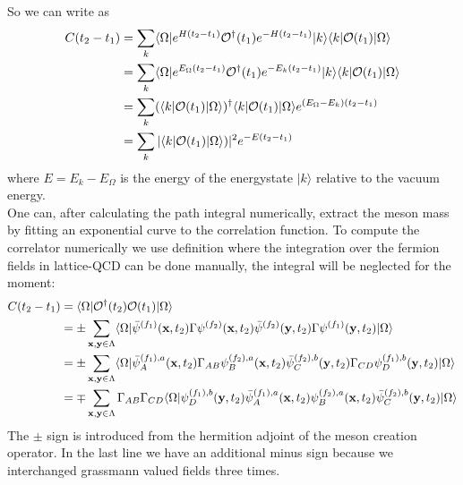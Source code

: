        So we can write  as
        \begin{equation}
            \begin{aligned}
                C(t_2 - t_1) &= \sum_k \langle\Omega|e^{H(t_2 - t_1)}\mathcal{O}^\dagger(t_1)e^{-H(t_2 - t_1)} |k\rangle\langle k| \mathcal{O}(t_1)|\Omega\rangle\\
                &= \sum_k \langle\Omega|e^{E_\Omega(t_2 - t_1)}\mathcal{O}^\dagger(t_1)e^{-E_k(t_2 - t_1)} |k\rangle\langle k| \mathcal{O}(t_1)|\Omega\rangle\\
                &= \sum_k (\langle k|\mathcal{O}(t_1) |\Omega\rangle)^\dagger\langle k| \mathcal{O}(t_1)|\Omega\rangle e^{(E_\Omega - E_k)(t_2 - t_1)}\\
                &= \sum_k |\langle k|\mathcal{O}(t_1) |\Omega\rangle)|^2 e^{-E(t_2 - t_1)}\\
            \end{aligned}
        \end{equation}
        where $E = E_k - E_\Omega$ is the energy of the energystate $|k\rangle$ relative to the vacuum energy.\\
        
        \noindent
        One can, after calculating the path integral numerically, extract the meson mass by fitting an exponential curve to the correlation function.
        To compute the correlator numerically we use definition  where the integration over the fermion fields in lattice-QCD can be done manually, the integral will be neglected for the moment:
        \begin{equation}\label{correlation_in_t}
            \begin{aligned}
                C(t_2 - t_1) &= \langle\Omega|\mathcal{O}^\dagger(t_2)\mathcal{O}(t_1)|\Omega\rangle\\
                &= \pm \sum_{\textbf{x},\textbf{y}\in\Lambda}
                \langle\Omega|\bar{\psi}^{(f_1)}(\textbf{x},t_2)\Gamma\psi^{(f_2)}(\textbf{x},t_2)
                \bar{\psi}^{(f_2)}(\textbf{y},t_2)\Gamma\psi^{(f_1)}(\textbf{y},t_2)|\Omega\rangle\\
                &= \pm \sum_{\textbf{x},\textbf{y}\in\Lambda}
                \langle\Omega|\bar{\psi}_A^{(f_1),a}(\textbf{x},t_2)\Gamma_{AB}\psi_B^{(f_2),a}(\textbf{x},t_2)
                \bar{\psi}^{(f_2),b}_C(\textbf{y},t_2)\Gamma_{CD}\psi_D^{(f_1),b}(\textbf{y},t_2)|\Omega\rangle\\
                &= \mp \sum_{\textbf{x},\textbf{y}\in\Lambda}\Gamma_{AB}\Gamma_{CD}
                \langle\Omega|\psi_D^{(f_1),b}(\textbf{y},t_2)\bar{\psi}_A^{(f_1),a}(\textbf{x},t_2)
                \psi_B^{(f_2),a}(\textbf{x},t_2)\bar{\psi}^{(f_2),b}_C(\textbf{y},t_2)|\Omega\rangle
            \end{aligned}
        \end{equation}
        The $\pm$ sign is introduced from the hermition adjoint  of the meson creation operator. In the last line we have an additional minus sign because we interchanged grassmann valued fields three times.\\
        
